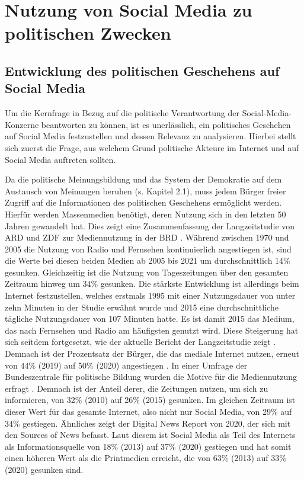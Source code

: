 \section{Nutzung von Social Media zu politischen Zwecken}

\subsection{Entwicklung des politischen Geschehens auf Social Media}
Um die Kernfrage in Bezug auf die politische Verantwortung der Social-Media-Konzerne beantworten zu können, ist es unerlässlich, ein politisches Geschehen auf Social Media festzustellen und dessen Relevanz zu analysieren. Hierbei stellt sich zuerst die Frage, aus welchem Grund politische Akteure im Internet und auf Social Media auftreten sollten.

Da die politische Meinungsbildung und das System der Demokratie auf dem Austausch von Meinungen beruhen (s. Kapitel 2.1), muss jedem Bürger freier Zugriff auf die Informationen des politischen Geschehens ermöglicht werden. Hierfür werden Massenmedien benötigt, deren Nutzung sich in den letzten 50 Jahren gewandelt hat. Dies zeigt eine Zusammenfassung der Langzeitstudie von ARD und ZDF zur Mediennutzung in der BRD \autocite[vgl.][]{Mediennutzung2015}. Während zwischen 1970 und 2005 die Nutzung von Radio und Fernsehen kontinuierlich angestiegen ist, sind die Werte bei diesen beiden Medien ab 2005 bis 2021 um durchschnittlich 14\% gesunken. Gleichzeitig ist die Nutzung von Tageszeitungen über den gesamten Zeitraum hinweg um 34\% gesunken. Die stärkste Entwicklung ist allerdings beim Internet festzustellen, welches
erstmals 1995 mit einer Nutzungsdauer von unter zehn Minuten in der Studie erwähnt wurde und 2015 eine durchschnittliche tägliche Nutzungsdauer von 107 Minuten hatte. Es ist damit 2015 das Medium, das nach Fernsehen und Radio am häufigsten genutzt wird. Diese Steigerung hat sich seitdem fortgesetzt, wie der aktuelle Bericht der Langzeitstudie zeigt \autocite[vgl.][]{Mediennutzung2020}. Demnach ist der Prozentsatz der Bürger, die das mediale Internet nutzen, erneut von 44\% (2019) auf 50\% (2020) angestiegen \autocite[vgl.][2]{Mediennutzung2020PDF}. 
In einer Umfrage der Bundeszentrale für politische Bildung wurden die Motive für die Mediennutzung erfragt \autocite[vgl.][]{NutzungMedienBPB}. Demnach ist der Anteil derer, die Zeitungen nutzen, um sich zu informieren, von 32\% (2010) auf 26\% (2015) gesunken. Im gleichen Zeitraum ist dieser Wert für das gesamte Internet, also nicht nur Social Media, von 29\% auf 34\% gestiegen. Ähnliches zeigt der Digital News Report von 2020, der sich mit den \glqq Sources of News\grqq{}  \autocite[vgl.][71]{DNR2020} befasst. Laut diesem ist Social Media als Teil des Internets als Informationsquelle von 18\% (2013) auf 37\% (2020) gestiegen und hat somit einen höheren Wert als die Printmedien erreicht, die von 63\% (2013) auf 33\% (2020) gesunken sind.

